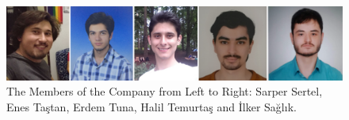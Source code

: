 \documentclass[a4paper,12pt]{article}
\begin{document}
%

\begin{figure}[b!]
	\centering
	\includegraphics[width=\textwidth,height=\textheight,keepaspectratio]{images/united-photo} 
	\caption{\label{fig:united-photo}The Members of the Company from Left to Right: Sarper Sertel, Enes Taştan, Erdem Tuna, Halil Temurtaş and İlker Sağlık.}
	
\end{figure}
\end{document}
